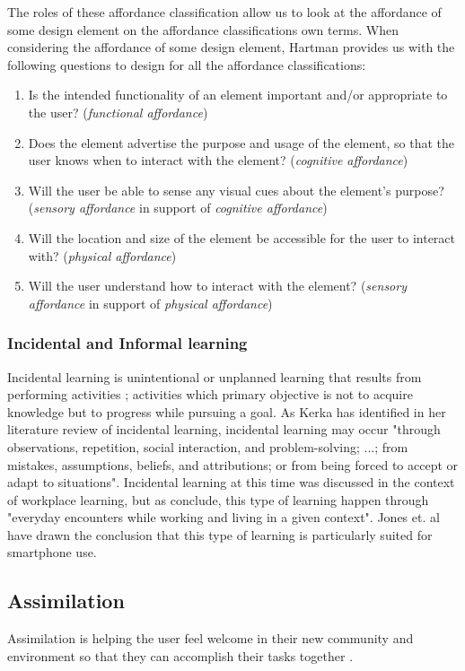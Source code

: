 The roles of these affordance classification allow us to look at the affordance of some design element on the affordance classifications own terms. When considering the affordance of some design element, Hartman provides us with the following questions to design for all the affordance classifications:
\begin{enumerate}
  \item Is the intended functionality of an element important and/or appropriate to the user? (\textit{functional affordance})
  \item Does the element advertise the purpose and usage of the element, so that the user knows when to interact with the element? (\textit{cognitive affordance})
  \item Will the user be able to sense any visual cues about the element's purpose? (\textit{sensory affordance} in support of \textit{cognitive affordance})
  \item Will the location and size of the element be accessible for the user to interact with? (\textit{physical affordance})
  \item Will the user understand how to interact with the element? (\textit{sensory affordance} in support of \textit{physical affordance})
\end{enumerate}

\subsubsection{Incidental and Informal learning}
Incidental learning is unintentional or unplanned learning that results from performing activities \cite{Kerka2000}; activities which primary objective is not to acquire knowledge but to progress while pursuing a goal. As Kerka \cite{Kerka2000} has identified in her literature review of incidental learning, incidental learning may occur "through observations, repetition, social interaction, and problem-solving; ...; from mistakes, assumptions, beliefs, and attributions; or from being forced to accept or adapt to situations". Incidental learning at this time was discussed in the context of workplace learning, but as \cite{Marsick2001} conclude, this type of learning happen through "everyday encounters while working and living in a given context". Jones et. al \cite{Jones2014} have drawn the conclusion that this type of learning is particularly suited for smartphone use.

\subsection{Assimilation}
\label{sec:assimilation}
Assimilation is helping the user feel welcome in their new community and environment so that they can accomplish their tasks together \cite{Bradt2009}.

